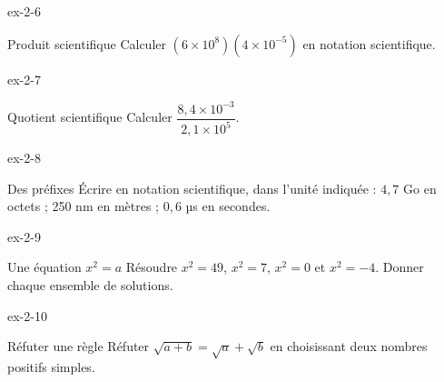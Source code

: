 \clearpage{}
\begin{blocLivre}{ex-2-6}\begin{exercice}[2]{Produit scientifique}
Calculer $(6\times10^8)(4\times10^{-5})$ en notation scientifique.
\end{exercice}\end{blocLivre}
\begin{blocLivre}{ex-2-7}\begin{exercice}[2]{Quotient scientifique}
Calculer $\dfrac{8{,}4\times10^{-3}}{2{,}1\times10^5}$.
\end{exercice}\end{blocLivre}
\begin{blocLivre}{ex-2-8}\begin{exercice}[2]{Des préfixes}
Écrire en notation scientifique, dans l’unité indiquée : $4{,}7$ Go en octets ; 250 nm en mètres ; $0{,}6$ µs en secondes.
\end{exercice}\end{blocLivre}
\begin{blocLivre}{ex-2-9}\begin{exercice}[2]{Une équation $x^2=a$}
Résoudre $x^2=49$, $x^2=7$, $x^2=0$ et $x^2=-4$. Donner chaque ensemble de solutions.
\end{exercice}\end{blocLivre}
\begin{blocLivre}{ex-2-10}\begin{exercice}[2]{Réfuter une règle}
Réfuter $\sqrt{a+b}=\sqrt a+\sqrt b$ en choisissant deux nombres positifs simples.
\end{exercice}\end{blocLivre}

